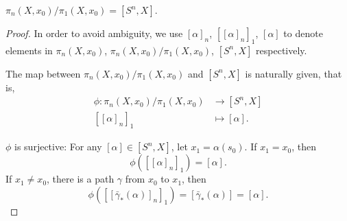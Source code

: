     \begin{theorem}
        $\pi_n(X,x_0)\big/\pi_1(X,x_0)=[S^n,X].$
    \end{theorem}

    \begin{proof}
        In order to avoid ambiguity, we use $[\alpha]_n$, $[[\alpha]_n]_1$, 
        $[\alpha]$ to denote elements in $\pi_n(X,x_0)$, 
        $\pi_n(X,x_0)\big/\pi_1(X,x_0)$, $[S^n,X]$ respectively.

        The map between $\pi_n(X,x_0)\big/\pi_1(X,x_0)$ and $[S^n,X]$ is 
        naturally given, that is,
        \begin{align*}
            \phi:\pi_n(X,x_0)\big/\pi_1(X,x_0)&\to[S^n,X] \\
            [[\alpha]_n]_1&\mapsto[\alpha].
        \end{align*}

        $\phi$ is surjective: For any $[\alpha]\in[S^n,X]$, 
        let $x_1=\alpha(s_0)$. If $x_1 = x_0$, then
        \begin{equation*}
            \phi([[\alpha]_n]_1)=[\alpha].
        \end{equation*}
        If $x_1\neq x_0$, there is a path $\gamma$ from $x_0$ to $x_1$, then
        \begin{equation*}
            \phi([[\bar{\gamma}_*(\alpha)]_n]_1)=[\bar{\gamma}_*(\alpha)] = [\alpha].
        \end{equation*}


\end{proof}

